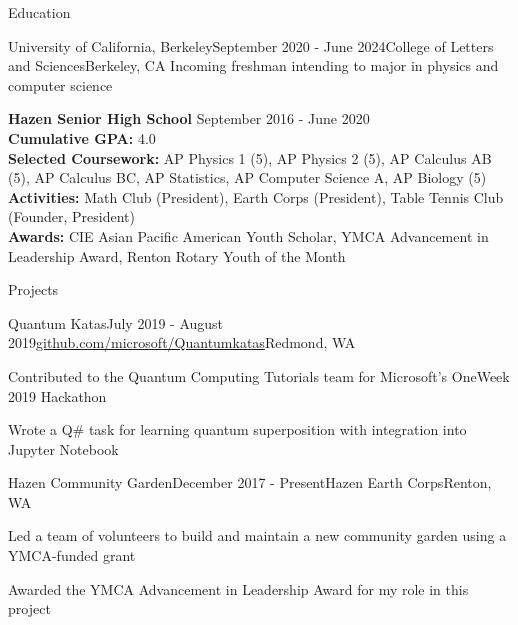 \documentclass{resume} %
\begin{document}
\begin{rSection}{Education}
    \begin{rSubsection}{University of California, Berkeley}{September 2020 - June 2024}{College of Letters and Sciences}{Berkeley, CA}
        Incoming freshman intending to major in physics and computer science
        \end{rSubsection}

{\bf Hazen Senior High School} \hfill {September 2016 - June 2020}\\
{\bf Cumulative GPA:} 4.0 \smallskip \\
{\bf Selected Coursework:} AP Physics 1 (5), AP Physics 2 (5), AP Calculus AB (5), AP Calculus BC, AP Statistics, AP Computer Science A, AP Biology (5)\\
{\bf Activities:} Math Club (President), Earth Corps (President), Table Tennis Club (Founder, President)\\
{\bf Awards:} CIE Asian Pacific American Youth Scholar, YMCA Advancement in Leadership Award,  Renton Rotary Youth of the Month

\end{rSection}


\begin{rSection}{Projects}

\begin{rSubsection}{Quantum Katas}{July 2019 - August 2019}{\href{https://github.com/microsoft/QuantumKatas}{github.com/microsoft/Quantumkatas}}{Redmond, WA}
\item Contributed to the Quantum Computing Tutorials team for Microsoft's OneWeek 2019 Hackathon
\item Wrote a Q\# task for learning quantum superposition with integration into Jupyter Notebook
\end{rSubsection}

\begin{rSubsection}{Hazen Community Garden}{December 2017 - Present}{Hazen Earth Corps}{Renton, WA}
\item Led a team of volunteers to build and maintain a new community garden using a YMCA-funded grant
\item Awarded the YMCA Advancement in Leadership Award for my role in this project
\end{rSubsection}

\end{rSection}
\end{document}
